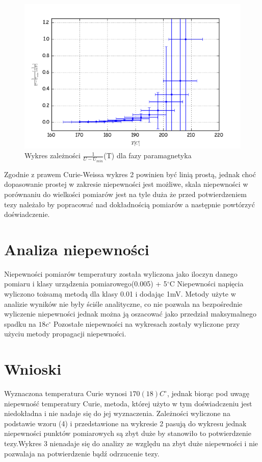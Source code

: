 \documentclass[a4paper,10pt]{article}
\begin{document}
\begin{figure}[H]
  \includegraphics{./Curie_odjete.png}
  \caption{Wykres zależności $\frac{1}{U-U_{min}}$(T) dla fazy paramagnetyka}
\end{figure}

Zgodnie z prawem Curie-Weissa wykres 2 powinien być linią prostą, jednak choć dopasowanie prostej w zakresie niepewności jest możliwe, skala niepewności w porównaniu do wielkości pomiarów jest na tyle duża że przed potwierdzeniem tezy należało by popracować nad dokładnością pomiarów a następnie powtórzyć doświadczenie.
\section{Analiza niepewności}

Niepewności pomiarów temperatury została wyliczona jako iloczyn danego pomiaru i klasy urządzenia pomiarowego(0.005) + 5$^\circ$C
Niepewności napięcia wyliczono tożsamą metodą dla klasy 0.01 i dodając 1mV.
Metody użyte w analizie wyników nie były ściśle analityczne, co nie pozwala na bezpośrednie wyliczenie niepewności jednak można ją oszacować jako przedział maksymalnego spadku na $18c^\circ$
Pozostałe niepewności na wykresach zostały wyliczone przy użyciu metody propagacji niepewności.
 
\section{Wnioski}
Wyznaczona temperatura Curie wynosi $170(18)C^\circ$, jednak biorąc pod uwagę niepewność temperatury Curie, metoda, której użyto w tym doświadczeniu jest niedokładna i  nie nadaje się do jej wyznaczenia.
Zależności wyliczone na podstawie wzoru (4) i przedstawione na wykresie 2 pasują do wykresu jednak niepewności punktów pomiarowych są zbyt duże by stanowiło to potwierdzenie tezy.Wykres 3 nienadaje się do analizy ze względu na zbyt duże niepewności i nie pozwalaja na potwierdzenie bądź odrzucenie tezy. 
\end{document}
